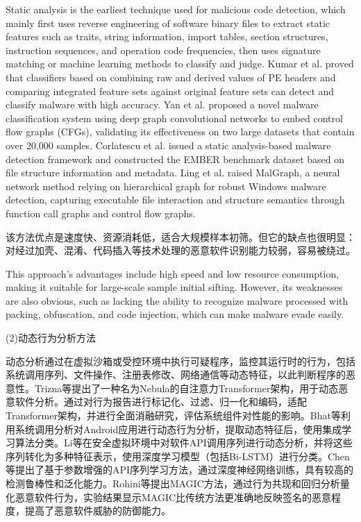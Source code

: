 Static analysis is the earliest technique used for malicious code detection, which mainly first uses reverse engineering of software binary files to extract static features such as traits, string information, import tables, section structures, instruction sequences, and operation code frequencies, then uses signature matching or machine learning methods to classify and judge. Kumar et al. proved that classifiers based on combining raw and derived values of PE headers and comparing integrated feature sets against original feature sets can detect and classify malware with high accuracy\cite{kumar2019learning}. Yan et al. proposed a novel malware classification system using deep graph convolutional networks to embed control flow graphs (CFGs), validating its effectiveness on two large datasets that contain over 20,000 samples\cite{yan2019classifying}. Corlatescu et al. issued a static analysis-based malware detection framework and constructed the EMBER benchmark dataset based on file structure information and metadata\cite{corlatescu2023embersim}. Ling et al. raised MalGraph, a neural network method relying on hierarchical graph for robust Windows malware detection, capturing executable file interaction and structure semantics through function call graphs and control flow graphs\cite{ling2022malgraph}.

该方法优点是速度快、资源消耗低，适合大规模样本初筛。但它的缺点也很明显：对经过加壳、混淆、代码插入等技术处理的恶意软件识别能力较弱，容易被绕过。

This approach's advantages include high speed and low resource consumption, making it suitable for large-scale sample initial sifting. However, its weaknesses are also obvious, such as lacking the ability to recognize malware processed with packing, obfuscation, and code injection, which can make malware evade easily.

(2)动态行为分析方法

动态分析通过在虚拟沙箱或受控环境中执行可疑程序，监控其运行时的行为，包括系统调用序列、文件操作、注册表修改、网络通信等动态特征，以此判断程序的恶意性。Trizna等\cite{trizna2024nebula}提出了一种名为Nebula的自注意力Transformer架构，用于动态恶意软件分析。通过对行为报告进行标记化、过滤、归一化和编码，适配Transformer架构，并进行全面消融研究，评估系统组件对性能的影响。Bhat等\cite{bhat2023system}利用系统调用分析对Android应用进行动态行为分析，提取动态特征后，使用集成学习算法分类。Li等\cite{li2022novel}在安全虚拟环境中对软件API调用序列进行动态分析，并将这些序列转化为多种特征表示，使用深度学习模型（包括Bi-LSTM）进行分类。Chen等\cite{chen2022cruparamer}提出了基于参数增强的API序列学习方法，通过深度神经网络训练，具有较高的检测鲁棒性和泛化能力。Rohini等\cite{rohini2024magic}提出MAGIC方法，通过行为共现和回归分析量化恶意软件行为，实验结果显示MAGIC比传统方法更准确地反映签名的恶意程度，提高了恶意软件威胁的防御能力。

